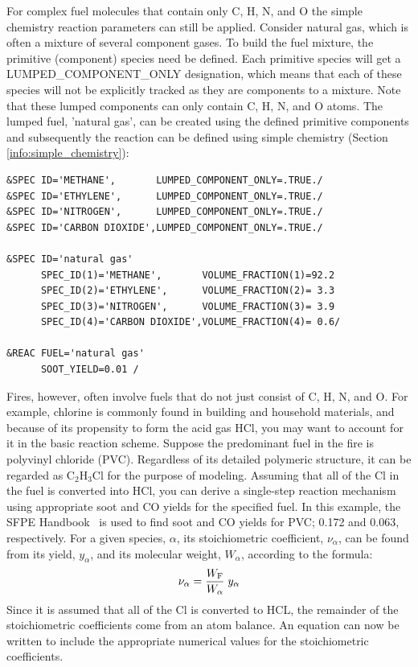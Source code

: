 \documentclass[11pt]{book}
\begin{document}
For complex fuel molecules that contain only C, H, N, and O the simple chemistry reaction parameters can still be applied. Consider natural gas, which is often a mixture of several component gases. To build the fuel mixture, the primitive (component) species need be defined. Each primitive species will get a {\ct LUMPED\_COMPONENT\_ONLY} designation, which means that each of these species will not be explicitly tracked as they are components to a mixture.  Note that these lumped components can only contain C, H, N, and O atoms. The lumped fuel, {\ct 'natural gas'}, can be created using the defined primitive components and subsequently the reaction can be defined using simple chemistry (Section \ref{info:simple_chemistry}):
\begin{lstlisting}
&SPEC ID='METHANE',       LUMPED_COMPONENT_ONLY=.TRUE./
&SPEC ID='ETHYLENE',      LUMPED_COMPONENT_ONLY=.TRUE./
&SPEC ID='NITROGEN',      LUMPED_COMPONENT_ONLY=.TRUE./
&SPEC ID='CARBON DIOXIDE',LUMPED_COMPONENT_ONLY=.TRUE./

&SPEC ID='natural gas'
      SPEC_ID(1)='METHANE',       VOLUME_FRACTION(1)=92.2
      SPEC_ID(2)='ETHYLENE',      VOLUME_FRACTION(2)= 3.3
      SPEC_ID(3)='NITROGEN',      VOLUME_FRACTION(3)= 3.9
      SPEC_ID(4)='CARBON DIOXIDE',VOLUME_FRACTION(4)= 0.6/

&REAC FUEL='natural gas'
      SOOT_YIELD=0.01 /
\end{lstlisting}
Fires, however, often involve fuels that do not just consist of C, H, N, and O. For example, chlorine is commonly found in building and household materials, and because
of its propensity to form the acid gas HCl, you may want to account for it in the basic reaction scheme. Suppose the predominant fuel in the fire is polyvinyl chloride (PVC). Regardless of its detailed polymeric structure, it can be regarded as C$_2$H$_3$Cl for the purpose of modeling. Assuming that all of the Cl in the fuel is converted into HCl, you can derive a single-step reaction mechanism using appropriate soot and CO yields for the specified fuel. In this example, the SFPE Handbook~\cite{SFPE:Tewarson} is used to find soot and CO yields for PVC; 0.172 and 0.063, respectively. For a given species, $\alpha$, its stoichiometric coefficient, $\nu_\alpha$, can be found from its yield, $y_\alpha$, and its molecular weight, $W_\alpha$, according to the formula:
\begin{equation}\label{eq:stoic_yield}
\nu_\alpha = \frac{W_{\rm F}}{W_\alpha} \; y_\alpha
\end{equation}
Since it is assumed that all of the Cl is converted to HCL, the remainder of the stoichiometric coefficients come from an atom balance. An equation can now be written to include the appropriate numerical values for the stoichiometric coefficients.
\end{document}
